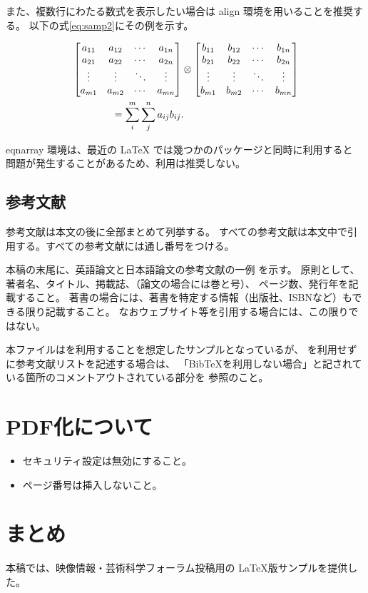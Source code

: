 \documentclass[a4paper,twocolumn]{jsarticle}
\begin{document}
また、複数行にわたる数式を表示したい場合は align 環境を用いることを推奨する。
以下の式\eqref{eq:samp2}にその例を示す。

\begin{align}
	& \begin{bmatrix}
	a_{11} & a_{12} & \cdots & a_{1n} \\
	a_{21} & a_{22} & \cdots & a_{2n} \\
	\vdots & \vdots & \ddots & \vdots \\
	a_{m1} & a_{m2} & \cdots & a_{mn} \\
	\end{bmatrix}
	\otimes
	\begin{bmatrix}
	b_{11} & b_{12} & \cdots & b_{1n} \\
	b_{21} & b_{22} & \cdots & b_{2n} \\
	\vdots & \vdots & \ddots & \vdots \\
	b_{m1} & b_{m2} & \cdots & b_{mn} \\
	\end{bmatrix} \notag \\
	& \qquad \qquad = \sum_{i}^{m}\sum_{j}^{n}a_{ij}b_{ij} .
	\label{eq:samp2}
\end{align}

eqnarray 環境は、最近の LaTeX では幾つかのパッケージと同時に利用すると
問題が発生することがあるため、利用は推奨しない。

\subsection{参考文献}
参考文献は本文の後に全部まとめて列挙する。
すべての参考文献は本文中で引用する。すべての参考文献には通し番号をつける。

本稿の末尾に、英語論文と日本語論文の参考文献の一例 \cite{Ito04} を示す。
原則として、著者名、タイトル、掲載誌、（論文の場合には巻と号）、
ページ数、発行年を記載すること。
著書の場合には、著書を特定する情報（出版社、ISBNなど）もできる限り記載すること。
なおウェブサイト等\cite{ArtScience}を引用する場合には、この限りではない。

本ファイルは\BibTeX を利用することを想定したサンプルとなっているが、
\BibTeX を利用せずに参考文献リストを記述する場合は、
「BibTeXを利用しない場合」と記されている箇所のコメントアウトされている部分を
参照のこと。

\section{PDF化について}
\begin{itemize}
\item セキュリティ設定は無効にすること。
\item ページ番号は挿入しないこと。
\end{itemize}

\section{まとめ}

本稿では、映像情報・芸術科学フォーラム投稿用の \LaTeX 版サンプルを提供した。

\end{document}

